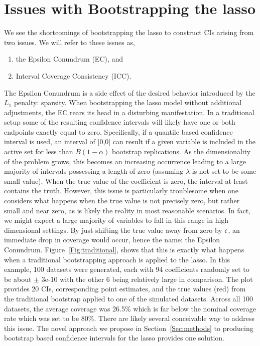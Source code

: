 \section{Issues with Bootstrapping the lasso}
\label{Sec:Difficulties}

We see the shortcomings of bootstrapping the lasso to construct CIs arising from two issues. We will refer to these issues as,

\begin{enumerate}
\item the Epsilon Conundrum (EC), and
\item Interval Coverage Consistency (ICC).
\end{enumerate}

The Epsilon Conundrum is a side effect of the desired behavior introduced by the $L_1$ penalty: sparsity. When bootstrapping the lasso model without additional adjustments, the EC rears its head in a disturbing manifestation. In a traditional setup some of the resulting confidence intervals will likely have one or both endpoints exactly equal to zero. Specifically, if a quantile based confidence interval is used, an interval of [0,0] can result if a given variable is included in the active set for less than $B(1 - \alpha)$ bootstrap replications. As the dimensionality of the problem grows, this becomes an increasing occurrence leading to a large majority of intervals possessing a length of zero (assuming $\lambda$ is not set to be some small value). When the true value of the coefficient is zero, the interval at least contains the truth. However, this issue is particularly troublesome when one considers what happens when the true value is not precisely zero, but rather small and near zero, as is likely the reality in most reasonable scenarios. In fact, we might expect a large majority of variables to fall in this range in high dimensional settings. By just shifting the true value away from zero by $\epsilon$, an immediate drop in coverage would occur, hence the name: the Epsilon Conundrum. Figure~\ref{Fig:traditional}, shows that this is exactly what happens when a traditional bootstrapping approach is applied to the lasso. In this example, 100 datasets were generated, each with 94 coefficients randomly set to be about $\pm$ 3e-10 with the other 6 being relatively large in comparison. The plot provides 20 CIs, corresponding point estimates, and the true values (red) from the traditional bootstrap applied to one of the simulated datasets. Across all 100 datasets, the average coverage was 26.5\% which is far below the nominal coverage rate which was set to be 80\%. There are likely several conceivable way to address this issue. The novel approach we propose in Section~\ref{Sec:methods} to producing bootstrap based confidence intervals for the lasso provides one solution.

